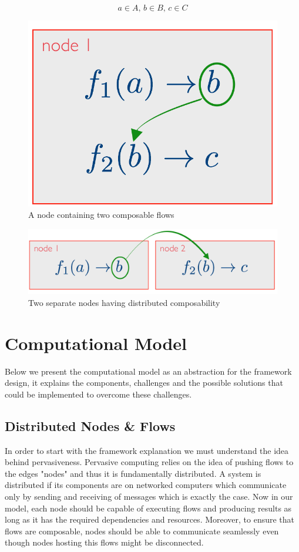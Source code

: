 \[a \in A, \, b \in B, \, c \in C\]
\begin{figure}[H]
	\centering
	\includegraphics[scale=0.3]{images/local-compose.png} 
 	\caption{A node containing two composable flows}
	\label{fig:compose}
\end{figure}
\begin{figure}[H]
	\centering
	\includegraphics[scale=0.4]{images/distributed-compose.png}
	\caption{Two separate nodes having distributed composability}
	\label{fig:compose2}
\end{figure}


\section{Computational Model}

Below we present the computational model as an abstraction for the framework design, it explains the components, challenges and the possible solutions that could be implemented to overcome these challenges. 	

\subsection{Distributed Nodes \& Flows}
In order to start with the framework explanation we must understand the idea behind pervasiveness. Pervasive computing relies on the idea of pushing flows to the edges "nodes" and thus it is fundamentally distributed. A system is distributed if its components  are on networked computers which communicate only by sending and receiving of messages \cite{DSYS} which is exactly the case. Now in our model, each node should be capable of executing flows and producing results as long as it  has the required dependencies and resources. Moreover, to ensure that flows are composable, nodes should be able to communicate seamlessly even though nodes hosting this flows might be disconnected.



